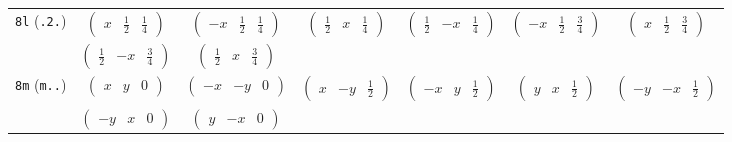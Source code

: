 \documentclass[fleqn,9pt,landscape]{jsarticle}
\begin{document}
\begin{center}
\begin{longtable}{ccccccc}
{\tt 8l} ({\tt .2.}) & $ \begin{pmatrix} x & \frac{1}{2} & \frac{1}{4} \end{pmatrix} $ & $ \begin{pmatrix} - x & \frac{1}{2} & \frac{1}{4} \end{pmatrix} $ & $ \begin{pmatrix} \frac{1}{2} & x & \frac{1}{4} \end{pmatrix} $ & $ \begin{pmatrix} \frac{1}{2} & - x & \frac{1}{4} \end{pmatrix} $ & $ \begin{pmatrix} - x & \frac{1}{2} & \frac{3}{4} \end{pmatrix} $ & $ \begin{pmatrix} x & \frac{1}{2} & \frac{3}{4} \end{pmatrix} $ \\
& $ \begin{pmatrix} \frac{1}{2} & - x & \frac{3}{4} \end{pmatrix} $ & $ \begin{pmatrix} \frac{1}{2} & x & \frac{3}{4} \end{pmatrix} $ & $  $ & $  $ & $  $ & $  $ \\ \hline
{\tt 8m} ({\tt m..}) & $ \begin{pmatrix} x & y & 0 \end{pmatrix} $ & $ \begin{pmatrix} - x & - y & 0 \end{pmatrix} $ & $ \begin{pmatrix} x & - y & \frac{1}{2} \end{pmatrix} $ & $ \begin{pmatrix} - x & y & \frac{1}{2} \end{pmatrix} $ & $ \begin{pmatrix} y & x & \frac{1}{2} \end{pmatrix} $ & $ \begin{pmatrix} - y & - x & \frac{1}{2} \end{pmatrix} $ \\
& $ \begin{pmatrix} - y & x & 0 \end{pmatrix} $ & $ \begin{pmatrix} y & - x & 0 \end{pmatrix} $ & $  $ & $  $ & $  $ & $  $ \\ \hline

\end{longtable}
\end{center}
\end{document}
